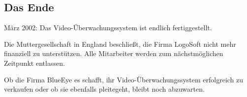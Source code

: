 \subsection{Das Ende}

März 2002: Das Video-Überwachungssystem ist endlich fertiggestellt.

Die Muttergesellschaft in England beschließt, die Firma LogoSoft nicht mehr
finanziell zu unterstützen. Alle Mitarbeiter werden zum nächstmöglichen
Zeitpunkt entlassen.

Ob die Firma BlueEye es schafft, ihr Video-Überwachungssystem erfolgreich zu
verkaufen oder ob sie ebenfalls pleitegeht, bleibt noch abzuwarten.
